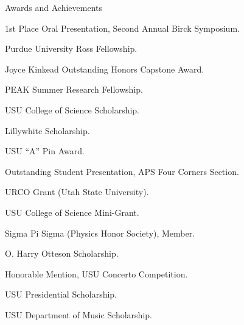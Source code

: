 \begin{rubric}{Awards and Achievements}

\entry*[2024] 1st Place Oral Presentation, Second Annual Birck Symposium.\par
\entry*[2021--2025] Purdue University Ross Fellowship.\par
\entry*[2021] Joyce Kinkead Outstanding Honors Capstone Award.\par
\entry*[2020] PEAK Summer Research Fellowship.\par
\entry*[2020] USU College of Science Scholarship.\par
\entry*[2020] Lillywhite Scholarship.\par
\entry*[2020] USU ``A'' Pin Award.\par
\entry*[2019] Outstanding Student Presentation, APS Four Corners Section.\par
\entry*[2019] URCO Grant (Utah State University).\par
\entry*[2019] USU College of Science Mini-Grant.\par
\entry*[2019] Sigma Pi Sigma (Physics Honor Society), Member.\par
\entry*[2019] O. Harry Otteson Scholarship.\par
\entry*[2018] Honorable Mention, USU Concerto Competition.\par
\entry*[2017--2021] USU Presidential Scholarship.\par
\entry*[2017--2019] USU Department of Music Scholarship.\par

\end{rubric}
